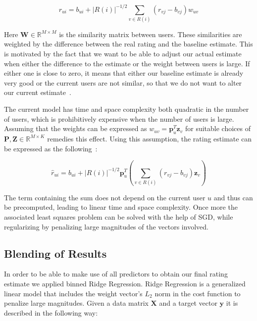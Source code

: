\documentclass[10pt,conference,compsocconf]{IEEEtran}
\newcommand{\abs}[1]{\left\lvert#1\right\rvert}
\begin{document}
\begin{equation}
  \hat{r}_{ui} = b_{ui} + \abs{R(i)}^{-1/2} \sum_{v \in R(i)} (r_{vj} -
  b_{vj})w_{uv}
\end{equation}

Here $\mathbf W \in \mathbb R^{M \times M}$ is the similarity matrix between
users. These similarities are weighted by the difference between the real
rating and the baseline estimate. This is motivated by the fact that we want
to be able to adjust our actual estimate when either the difference to the
estimate or the weight between users is large. If either one is close to zero,
it means that either our baseline estimate is already very good or the current
users are not similar, so that we do not want to alter our current
estimate~\cite{koren2010factor, koren2011advances}.

The current model has time and space complexity both quadratic in the number of
users, which is prohibitively expensive when the number of users is large.
Assuming that the weights can be expressed as $w_{uv} = \mathbf p_u^T \mathbf
z_v$ for suitable choices of $\mathbf P, \mathbf Z \in \mathbb R^{M\times K}$
remedies this effect. Using this assumption, the rating estimate can be
expressed as the following~\cite{koren2010factor, koren2011advances}:

\begin{equation}
  \hat{r}_{ui} = b_{ui} + \abs{R(i)}^{-1/2} \mathbf p_u^T \left( \sum_{v \in
      R(i)} (r_{vj} - b_{vj}) \mathbf z_v \right )
\end{equation}

The term containing the sum does not depend on the current user $u$ and thus
can be precomputed, leading to linear time and space complexity. Once more the
associated least squares problem can be solved with the help of SGD, while
regularizing by penalizing large magnitudes of the vectors involved.

\subsection{Blending of Results}
\label{sub:blending_of_results}

In order to be able to make use of all predictors to obtain our final rating
estimate we applied binned Ridge Regression. Ridge Regression is a generalized
linear model that includes the weight vector's $L_2$ norm in the cost function
to penalize large magnitudes. Given a data matrix $\mathbf X$ and a target
vector $\mathbf y$ it is described in the following way:
\end{document}
